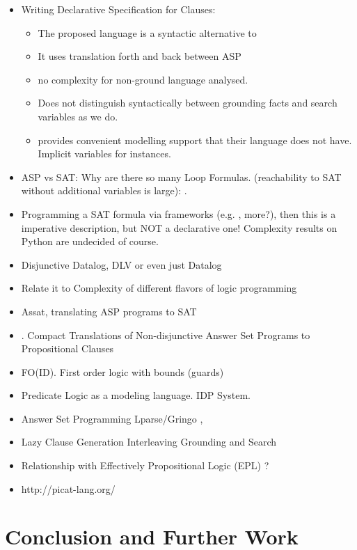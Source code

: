\documentclass[runningheads]{llncs}
\begin{document}
 \begin{itemize}
     \item Writing Declarative Specification for Clauses: \cite{Gebser16} 
         \begin{itemize}
             \item The proposed language is a syntactic alternative to \bcore
             \item It uses translation forth and back between ASP
             \item no complexity for non-ground language analysed. 
             \item Does not distinguish syntactically between grounding facts and search variables as we do. 
             \item \bnice provides convenient modelling support that their language does not have. Implicit variables for instances. 
         \end{itemize}
     \item ASP vs SAT: Why are there so many Loop Formulas. (reachability to SAT without additional variables is large): \cite{Lifschitz04} .
     \item Programming a SAT formula via frameworks (e.g. \cite{Pysat18},
         more?), then this is a imperative description, but NOT a declarative
         one! Complexity results on Python are undecided of course. 
     \item Disjunctive Datalog, DLV \cite{Eiter97} or even just Datalog \cite{Gottlob89}
     \item Relate it to Complexity of different flavors of logic programming \cite{Gottlob01}
     \item Assat, translating ASP programs to SAT \cite{Lin04}
     \item \cite{Janhunen11}. Compact Translations of Non-disjunctive Answer Set
         Programs to Propositional Clauses
     \item FO(ID). First order logic with bounds (guards) \cite{Wittocx10}
     \item Predicate Logic as a modeling language. IDP System. \cite{Cat18}
     \item Answer Set Programming Lparse/Gringo \cite{Gebser15}, \cite{Ferraris05}
     \item Lazy Clause Generation Interleaving Grounding and Search \cite{Cat15}
     \item Relationship with Effectively Propositional Logic (EPL) \cite{Moura08}? 
     \item http://picat-lang.org/
 \end{itemize}

\section{Conclusion and Further Work}



\end{document}

